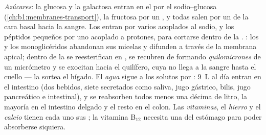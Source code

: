 \begin{proposition}\label{prop:b1:digestion-absorption:routes}
\emph{Azúcares}: la glucosa y la galactosa entran en el  por el
 sodio--glucosa (\cref{ch:b1:membranes-transport}), la fructosa
por un , y todas salen por un  de la cara basal
hacia la sangre. Los \emph{} entran por varios 
acoplados al sodio, y los péptidos pequeños por uno acoplado a protones,
para cortarse dentro de la . \emph{}: los  y los
monoglicéridos abandonan sus micelas y difunden a través de la membrana
apical; dentro de la  se reesterifican en , se recubren
de  formando \emph{quilomicrones} de un micrómetro y se exocitan
hacia el quilífero, cuya  no llega a la sangre hasta el cuello --- la
 sortea el hígado. El \emph{agua} sigue a los solutos por :
\qty{9}{L} al día entran en el intestino (dos bebidos, siete secretados como
saliva, jugo gástrico, bilis, jugo pancreático e intestinal), y se
reabsorben todos menos una décima de litro, la mayoría en el intestino
delgado y el resto en el colon. Las \emph{vitaminas}, el \emph{hierro} y el
\emph{calcio} tienen cada uno sus ; la vitamina B$_{12}$
necesita una  del estómago para poder absorberse siquiera.
\end{proposition}

